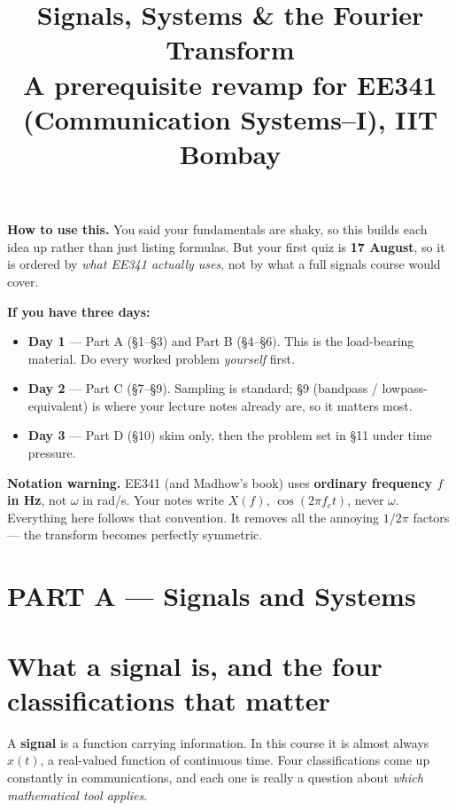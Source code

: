 \documentclass[11pt,a4paper]{article}
\title{\vspace{-1.5cm}\textbf{\color{keyblue}Signals, Systems \& the Fourier Transform}\\[4pt]
\large A prerequisite revamp for EE341 (Communication Systems--I), IIT Bombay}
\author{}
\date{}
\begin{document}
\maketitle
\vspace{-1.2cm}

\begin{keybox}
\textbf{How to use this.} You said your fundamentals are shaky, so this builds each idea up rather than
just listing formulas. But your first quiz is \textbf{17 August}, so it is ordered by \emph{what EE341 actually
uses}, not by what a full signals course would cover.

\medskip
\noindent\textbf{If you have three days:}
\begin{itemize}[nosep,leftmargin=*]
\item \textbf{Day 1} --- Part A (\S1--\S3) and Part B (\S4--\S6). This is the load-bearing material. Do every worked problem \emph{yourself} first.
\item \textbf{Day 2} --- Part C (\S7--\S9). Sampling is standard; \S9 (bandpass / lowpass-equivalent) is where your lecture notes already are, so it matters most.
\item \textbf{Day 3} --- Part D (\S10) skim only, then the problem set in \S11 under time pressure.
\end{itemize}

\medskip
\noindent\textbf{Notation warning.} EE341 (and Madhow's book) uses \textbf{ordinary frequency $f$ in Hz}, not
$\omega$ in rad/s. Your notes write $X(f)$, $\cos(2\pi f_c t)$, never $\omega$. Everything here follows that
convention. It removes all the annoying $1/2\pi$ factors --- the transform becomes perfectly symmetric.
\end{keybox}

\tableofcontents
\newpage

\section*{\color{keyblue}PART A --- Signals and Systems}

\section{What a signal is, and the four classifications that matter}

A \textbf{signal} is a function carrying information. In this course it is almost always $x(t)$, a real-valued
function of continuous time. Four classifications come up constantly in communications, and each one is really
a question about \emph{which mathematical tool applies}.
\end{document}
